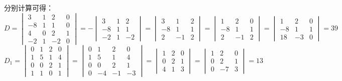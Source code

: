 \begin{solution}
    分别计算可得：\[
    D=\begin{vmatrix}3&1&2&0\\-8&1&1&0\\4&0&2&1\\-2&1&-2&0\end{vmatrix}=-\begin{vmatrix}3&1&2\\-8&1&1\\-2&1&-2\end{vmatrix}=\begin{vmatrix}3&1&2\\-8&1&1\\2&-1&2\end{vmatrix}=\begin{vmatrix}1&2&0\\-8&1&1\\2&-1&2\end{vmatrix}=\begin{vmatrix}1&2&0\\-8&1&1\\18&-3&0\end{vmatrix}=39\]
    \[D_1=\begin{vmatrix}0&1&2&0\\1&5&1&4\\0&0&2&1\\1&1&0&1\end{vmatrix}=\begin{vmatrix}0&1&2&0\\1&5&1&4\\0&0&2&1\\0&-4&-1&-3\end{vmatrix}=\begin{vmatrix}1&2&0\\0&2&1\\4&1&3\end{vmatrix}=\begin{vmatrix}1&2&0\\0&2&1\\0&-7&3\end{vmatrix}=13\]

\end{solution}
